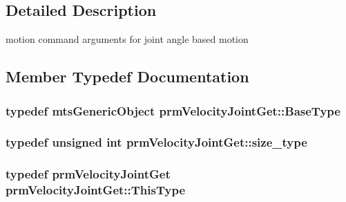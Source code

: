 \subsection{Detailed Description}
motion command arguments for joint angle based motion 

\subsection{Member Typedef Documentation}
\hypertarget{classprm_velocity_joint_get_ad043b0f13500d770bef8eca12241e581}{
\subsubsection[{Base\-Type}]{\setlength{\rightskip}{0pt plus 5cm}typedef {\bf mts\-Generic\-Object} {\bf prm\-Velocity\-Joint\-Get\-::\-Base\-Type}}}\label{classprm_velocity_joint_get_ad043b0f13500d770bef8eca12241e581}
\hypertarget{classprm_velocity_joint_get_af8a1c509111e5ac2e38dfe32bc6d9914}{
\subsubsection[{size\-\_\-type}]{\setlength{\rightskip}{0pt plus 5cm}typedef unsigned int {\bf prm\-Velocity\-Joint\-Get\-::size\-\_\-type}}}\label{classprm_velocity_joint_get_af8a1c509111e5ac2e38dfe32bc6d9914}
\hypertarget{classprm_velocity_joint_get_a97c1b10ad949296590e6106c69e94d02}{
\subsubsection[{This\-Type}]{\setlength{\rightskip}{0pt plus 5cm}typedef {\bf prm\-Velocity\-Joint\-Get} {\bf prm\-Velocity\-Joint\-Get\-::\-This\-Type}}}\label{classprm_velocity_joint_get_a97c1b10ad949296590e6106c69e94d02}


